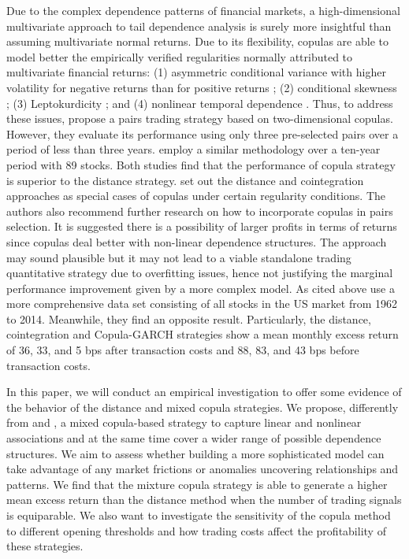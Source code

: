 \documentclass[a4paper]{article}
\begin{document}
Due to the complex dependence patterns of financial markets, a high-dimensional multivariate approach to tail dependence analysis is surely more insightful than assuming multivariate normal returns. Due to its flexibility, copulas are able to model better the empirically verified regularities normally attributed to multivariate financial returns: (1) asymmetric conditional variance with higher volatility for negative returns than for positive returns \citep{h98}; (2) conditional skewness \citep{ait01,chen01,patton01}; (3) Leptokurdicity \citep{t01,andreou01}; and (4) nonlinear temporal dependence \citep{cont01,campbell97}. Thus, to address these issues, \citet*{lw2013} propose a pairs trading strategy based on two-dimensional copulas. However, they evaluate its performance using only three pre-selected pairs over a period of less than three years. \citet*{xie14} employ a similar methodology over a ten-year period with 89 stocks. Both studies find that the performance of copula strategy is superior to the distance strategy. \citet*{xw13} set out the distance and cointegration approaches as special cases of copulas under certain regularity conditions. The authors also recommend further research on how to incorporate copulas in pairs selection. It is suggested there is a possibility of larger profits in terms of returns since copulas deal better with non-linear dependence structures. The approach may sound plausible but it may not lead to a viable standalone trading quantitative strategy due to overfitting issues, hence not justifying the marginal performance improvement given by a more complex model. As cited above \citet*{rf15} use a more comprehensive data set consisting of all stocks in the US market from 1962 to 2014. Meanwhile, they find an opposite result. Particularly, the distance, cointegration and Copula-GARCH strategies show a mean monthly excess return of 36, 33, and 5 bps after transaction costs and 88, 83, and 43 bps before transaction costs.

In this paper, we will conduct an empirical investigation to offer some evidence of the behavior of the distance and mixed copula strategies. We propose, differently from \citet*{rf15} and \citet*{xie14}, a mixed copula-based strategy to capture linear and nonlinear associations and at the same time cover a wider range of possible dependence structures. We aim to assess whether building a more sophisticated model can take advantage of any market frictions or anomalies uncovering relationships and patterns. We find that the mixture copula strategy is able to generate a higher mean excess return than the distance method when the number of trading signals is equiparable. We also want to investigate the sensitivity of the copula method to different opening thresholds and how trading costs affect the profitability of these strategies.
\end{document}
